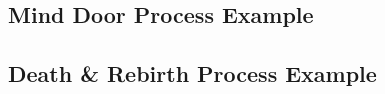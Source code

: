 \documentclass[a4paper, 12pt]{article}
\begin{document}
\pagebreak

\subsection*{Mind Door Process Example}

\begin{center}

\end{center}

\vspace{10mm}

\subsection*{Death \& Rebirth Process Example}

\begin{center}

\end{center}
\end{document}
